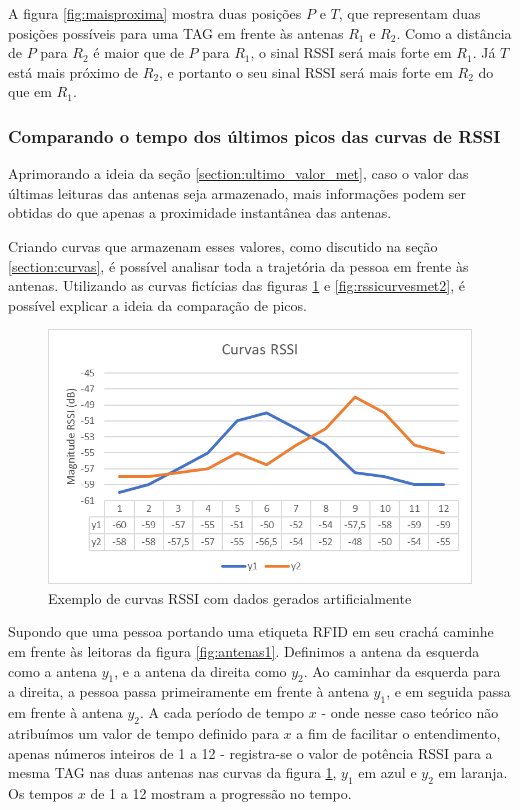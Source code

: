   A figura \ref{fig:maisproxima} mostra duas posições $P$ e $T$, que representam duas posições possíveis para uma TAG em frente às antenas $R_1$ e $R_2$. Como a distância de $P$ para $R_2$ é maior que de $P$ para $R_1$, o sinal RSSI será mais forte em $R_1$. Já $T$ está mais próximo de $R_2$, e portanto o seu sinal RSSI será mais forte em $R_2$ do que em $R_1$.

 \subsubsection{Comparando o tempo dos últimos picos das curvas de RSSI} \label{section:picos_met}
 
 Aprimorando a ideia da seção \ref{section:ultimo_valor_met}, caso o valor das últimas leituras das antenas seja armazenado, mais informações podem ser obtidas do que apenas a proximidade instantânea das antenas.
 
 Criando curvas que armazenam esses valores, como discutido na seção \ref{section:curvas}, é possível analisar toda a trajetória da pessoa em frente às antenas. Utilizando as curvas fictícias das figuras \ref{fig:rssicurvesmet1} e \ref{fig:rssicurvesmet2}, é possível explicar a ideia da comparação de picos.
 
\begin{figure}[H]
    \centering
    \includegraphics[width=0.8\linewidth]{figs/Metodologia/image001.png}
    \caption{Exemplo de curvas RSSI com dados gerados artificialmente}
    \label{fig:rssicurvesmet1}
\end{figure}


 Supondo que uma pessoa portando uma etiqueta RFID em seu crachá caminhe em frente às leitoras da figura \ref{fig:antenas1}. Definimos a antena da esquerda como a antena $y_1$, e a antena da direita como $y_2$. Ao caminhar da esquerda para a direita, a pessoa passa primeiramente em frente à antena $y_1$, e em seguida passa em frente à antena $y_2$. A cada período de tempo $x$ - onde nesse caso teórico não atribuímos um valor de tempo definido para $x$ a fim de facilitar o entendimento, apenas números inteiros de 1 a 12 - registra-se o valor de potência RSSI para a mesma TAG nas duas antenas nas curvas da figura \ref{fig:rssicurvesmet1}, $y_1$ em azul e $y_2$ em laranja. Os tempos $x$ de 1 a 12 mostram a progressão no tempo.
 
